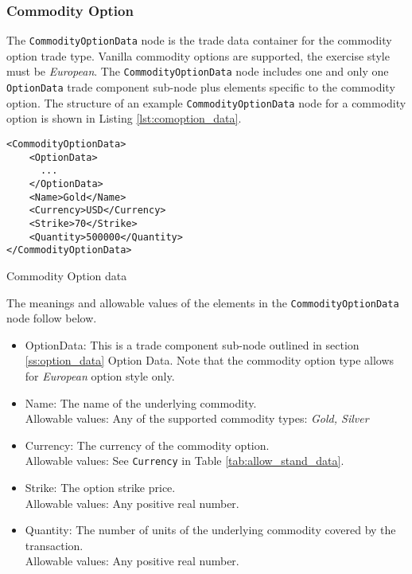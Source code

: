 \subsubsection{Commodity Option}

The \lstinline!CommodityOptionData!  node is the trade data container for the commodity option trade type.  Vanilla commodity 
options are supported, the exercise style must be \emph{European}. The \lstinline!CommodityOptionData!  node includes one and 
only one \lstinline!OptionData! trade component sub-node plus elements specific to the commodity option. The structure of 
an example \lstinline!CommodityOptionData! node for a commodity option is shown in Listing
\ref{lst:comoption_data}.

\begin{listing}[H]
\begin{verbatim}
<CommodityOptionData>
    <OptionData>
      ...
    </OptionData>
    <Name>Gold</Name>
    <Currency>USD</Currency>
    <Strike>70</Strike>
    <Quantity>500000</Quantity>
</CommodityOptionData>
\end{verbatim}
\caption{Commodity Option data}
\label{lst:comoption_data}
\end{listing}

The meanings and allowable values of the elements in the \lstinline!CommodityOptionData!  node follow below.

\begin{itemize}
	\item OptionData: This is a trade component sub-node outlined in section \ref{ss:option_data} Option Data. Note 
	that the commodity option type allows for \emph{European} option style only.	
	\item Name: The name of the underlying commodity. \\
	Allowable values:  Any of the supported commodity types:  \emph{Gold, Silver}
	\item Currency: The currency of the commodity option. \\
	Allowable values:  See \lstinline!Currency! in Table \ref{tab:allow_stand_data}.	
	\item Strike: The option strike price.\\
	Allowable values:  Any positive real number.	
	\item Quantity: The number of units of the underlying commodity covered by the transaction. \\
	Allowable values:  Any positive real number.
\end{itemize}